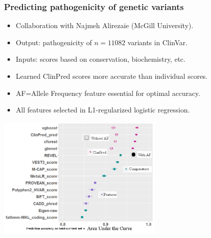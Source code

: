 \documentclass{beamer}
\begin{document}


\begin{frame}
  \frametitle{Predicting pathogenicity of genetic variants}
  \begin{itemize}
  \item Collaboration with Najmeh Alirezaie (McGill University).
  \item Output: pathogenicity of $n=11082$ variants in ClinVar.
  \item Inputs: scores based on conservation, biochemistry, etc.
  \item Learned ClinPred scores more accurate than individual scores.
  \item AF=Allele Frequency feature essential for optimal accuracy.
  \item All features selected in L1-regularized logistic regression.
  \end{itemize}
  \begin{center}
    \includegraphics[width=0.6\textwidth]{Screenshot-clinpred-auc}
  \end{center}
\end{frame}
 
\end{document}
